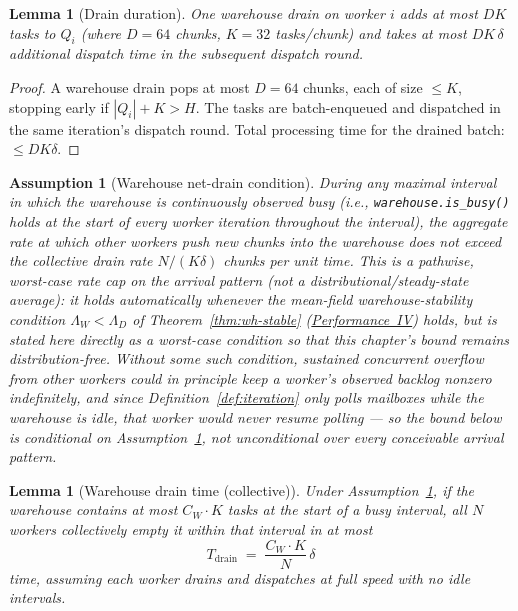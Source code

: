 \documentclass[11pt,a4paper]{report}
\newtheorem{lemma}[theorem]{Lemma}
\newtheorem{assumption}{Assumption}[section]
\newcommand{\code}[1]{\texttt{#1}}
\begin{document}
\begin{lemma}[Drain duration]
\label{lem:drain}
One warehouse drain on worker $i$ adds at most
$DK$ tasks to $Q_i$ (where $D=64$ chunks, $K=32$ tasks/chunk)
and takes at most $DK\,\delta$ additional dispatch time in the
subsequent dispatch round.
\end{lemma}

\begin{proof}
A warehouse drain pops at most $D=64$ chunks, each of size
$\leq K$, stopping early if $|Q_i| + K > H$.  The tasks are
batch-enqueued and dispatched in the same iteration's dispatch
round. Total processing time for the drained batch: $\leq DK\delta$.
\end{proof}

\begin{assumption}[Warehouse net-drain condition]
\label{ass:wh-net-drain}
During any maximal interval in which the warehouse is continuously
observed busy (i.e., \code{warehouse.is\_busy()} holds at the start of
every worker iteration throughout the interval), the aggregate rate at
which \emph{other} workers push new chunks into the warehouse does not
exceed the collective drain rate $N/(K\delta)$ chunks per unit time.
This is a pathwise, worst-case rate cap on the arrival pattern (not a
distributional/steady-state average): it holds automatically whenever
the mean-field warehouse-stability condition
$\Lambda_W < \Lambda_D$ of Theorem~\ref{thm:wh-stable}
(\hyperref[chap:stability]{Performance~IV}) holds, but is stated here
directly as a worst-case condition so that this chapter's bound remains
distribution-free. Without some such condition, sustained concurrent
overflow from other workers could in principle keep a worker's
observed backlog nonzero indefinitely, and since
Definition~\ref{def:iteration} only polls mailboxes while the
warehouse is idle, that worker would never resume
polling --- so the bound below is conditional on
Assumption~\ref{ass:wh-net-drain}, not unconditional over every
conceivable arrival pattern.
\end{assumption}

\begin{lemma}[Warehouse drain time (collective)]
\label{lem:wdrain}
Under Assumption~\ref{ass:wh-net-drain}, if the warehouse contains at
most $C_W \cdot K$ tasks at the start of a busy interval, all $N$
workers collectively empty it within that interval in at most
\[
  T_{\mathrm{drain}} \;=\; \frac{C_W \cdot K}{N}\,\delta
\]
time, assuming each worker drains and dispatches at full speed with
no idle intervals.
\end{lemma}
\end{document}
